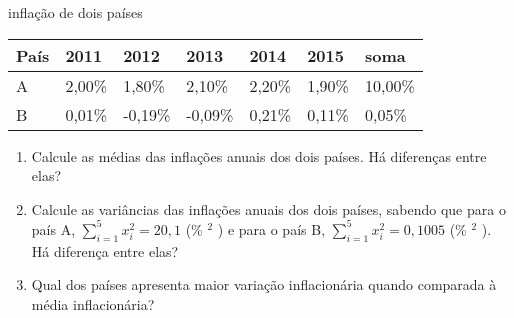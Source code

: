 \begin{task}{inflação de dois países}
\begin{savenotes}
\begin{tabulary}{\linewidth}[t]{|T|T|T|T|T|T|T|}
País
&
2011
&
2012
&
2013
&
2014
&
2015
&
soma
\\
\hline
A
&
2,00\%
&
1,80\%
&
2,10\%
&
2,20\%
&
1,90\%
&
10,00\%
\\
\hline
B
&
0,01\%
&
-0,19\%
&
-0,09\%
&
0,21\%
&
0,11\%
&
0,05\%
\\
\hline
\end{tabulary}
\par
\sphinxattableend\end{savenotes}
\begin{enumerate}
\item {} 
Calcule as médias das inflações anuais dos dois países. Há diferenças entre elas?

\item {} 
Calcule as variâncias das inflações anuais dos dois países, sabendo que para o país A, \(\displaystyle{\sum^5_{i=1}}x^2_i=20,1\)  (\% \(^2\) ) e para o país B,  \(\displaystyle{\sum^5_{i=1}}x^2_i=0,1005\)  (\% \(^2\) ). Há diferença entre elas?

\item {} 
Qual dos países apresenta maior variação inflacionária quando comparada à média inflacionária?

\end{enumerate}
\end{task}


